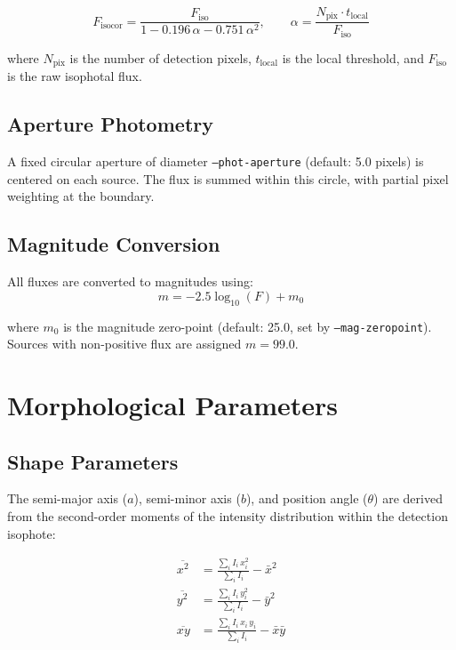 \documentclass[11pt,fleqn]{book}
\begin{document}
\begin{equation}
F_{\text{isocor}} = \frac{F_{\text{iso}}}{1 - 0.196\,\alpha - 0.751\,\alpha^2}, \qquad
\alpha = \frac{N_{\text{pix}} \cdot t_{\text{local}}}{F_{\text{iso}}}
\end{equation}

where $N_{\text{pix}}$ is the number of detection pixels, $t_{\text{local}}$ is the local threshold, and $F_{\text{iso}}$ is the raw isophotal flux.

\subsection{Aperture Photometry}

A fixed circular aperture of diameter \texttt{--phot-aperture} (default: 5.0 pixels) is centered on each source. The flux is summed within this circle, with partial pixel weighting at the boundary.

\subsection{Magnitude Conversion}

All fluxes are converted to magnitudes using:
\begin{equation}
m = -2.5 \log_{10}(F) + m_0
\end{equation}

where $m_0$ is the magnitude zero-point (default: 25.0, set by \texttt{--mag-zeropoint}). Sources with non-positive flux are assigned $m = 99.0$.


\section{Morphological Parameters}

\subsection{Shape Parameters}

The semi-major axis ($a$), semi-minor axis ($b$), and position angle ($\theta$) are derived from the second-order moments of the intensity distribution within the detection isophote:

\begin{align}
\overline{x^2} &= \frac{\sum_i I_i \, x_i^2}{\sum_i I_i} - \bar{x}^2 \\
\overline{y^2} &= \frac{\sum_i I_i \, y_i^2}{\sum_i I_i} - \bar{y}^2 \\
\overline{xy}  &= \frac{\sum_i I_i \, x_i \, y_i}{\sum_i I_i} - \bar{x}\bar{y}
\end{align}
\end{document}
